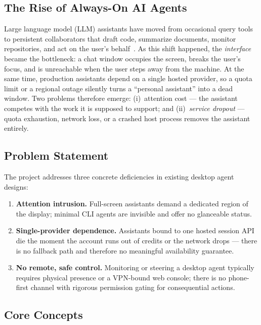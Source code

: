 \documentclass[conference]{IEEEtran}
\begin{document}
\subsection{The Rise of Always-On AI Agents}

Large language model (LLM) assistants have moved from
occasional query tools to persistent collaborators that draft
code, summarize documents, monitor repositories, and act on the
user's behalf~\cite{react,tooluse}. As this shift happened, the
\emph{interface} became the bottleneck: a chat window occupies
the screen, breaks the user's focus, and is unreachable when the
user steps away from the machine. At the same time, production
assistants depend on a single hosted provider, so a quota limit
or a regional outage silently turns a ``personal assistant'' into
a dead window. Two problems therefore emerge: (i)~attention cost
--- the assistant competes with the work it is supposed to
support; and (ii)~\emph{service dropout} --- quota exhaustion,
network loss, or a crashed host process removes the assistant
entirely.

\subsection{Problem Statement}

The project addresses three concrete deficiencies in existing
desktop agent designs:

\begin{enumerate}
  \item \textbf{Attention intrusion.} Full-screen assistants
  demand a dedicated region of the display; minimal CLI agents
  are invisible and offer no glanceable status.
  \item \textbf{Single-provider dependence.} Assistants bound to
  one hosted session API die the moment the account runs out of
  credits or the network drops --- there is no fallback path and
  therefore no meaningful availability guarantee.
  \item \textbf{No remote, safe control.} Monitoring or steering
  a desktop agent typically requires physical presence or a
  VPN-bound web console; there is no phone-first channel with
  rigorous permission gating for consequential actions.
\end{enumerate}

\subsection{Core Concepts}
\end{document}
